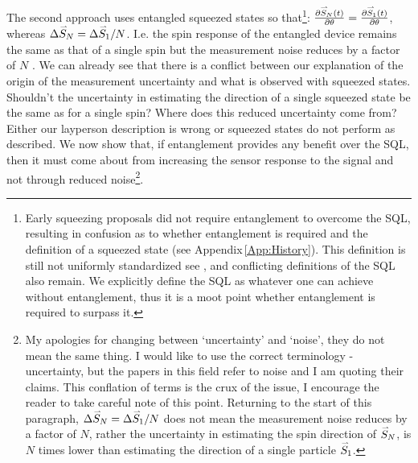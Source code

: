 \documentclass[reqno]{amsart}
\newcommand{\myvec}[1]{\accentset{\rightharpoonup}{#1}}
\begin{document}
The second approach uses entangled squeezed states so that\footnote{Early squeezing proposals did not require entanglement to overcome the SQL, resulting in confusion as to whether entanglement is required and the definition of a squeezed state (see Appendix\,\ref{App:History}). This definition is still not uniformly standardized see \cite{Soerensen2001,Meyer2001,Maccone2020}, and conflicting definitions of the SQL also remain. We explicitly define the SQL as whatever one can achieve without entanglement, thus it is a moot point whether entanglement is required to surpass it.}: $\frac{\partial \myvec{S}_N(t)}{\partial \theta} = \frac{\partial \myvec{S}_1(t)}{\partial \theta}$, whereas $\Delta \myvec{S}_N = \Delta \myvec{S}_1/N$. I.e. the spin response of the entangled device remains the same as that of a single spin but the measurement noise reduces by a factor of $N$ \cite{Caves1981, Ma2011, Pezze2018, Gross2012, Ludlow2015, Walls1983, Wodkiewicz1985, Wu1986, Slusher1987, Xiao1987, Polzik1992, Wineland1992, Kitagawa1993, Wineland1994, Sanders1995, Kuzmich1998, Soerensen1998, Brif1999, Kuzmich2000, Meyer2001, Esteve2008, Appel2009, Eberle2010, Gross2010, Koschorreck2010, Koschorreck2010a, Leroux2010, Leroux2010a, LouchetChauvet2010, SchleierSmith2010, Wasilewski2010, Luecke2011, Sewell2012, Aasi2013, Taylor2013, Bohnet2014, Muessel2014, Strobel2014, Kruse2016, Polzik2016, Cox2016, Davis2016, Bohnet2016, Hosten2016, Linnemann2016, Macri2016, Tse2019, Braverman2019, Schulte2020, Malia2020, Bao2020, PedrozoPenafiel2020, Casacio2021, Gilmore2021, Greve2022, Malia2022}. We can already see that there is a conflict between our explanation of the origin of the measurement uncertainty and what is observed with squeezed states. Shouldn't the uncertainty in estimating the direction of a single squeezed state be the same as for a single spin? Where does this reduced uncertainty come from? Either our layperson description is wrong or squeezed states do not perform as described. We now show that, if entanglement provides any benefit over the SQL, then it must come about from increasing the sensor response to the signal and not through reduced noise\footnote{My apologies for changing between `uncertainty' and `noise', they do not mean the same thing. I would like to use the correct terminology - uncertainty, but the papers in this field refer to noise and I am quoting their claims. This conflation of terms is the crux of the issue, I encourage the reader to take careful note of this point. Returning to the start of this paragraph, $\Delta \myvec{S}_N = \Delta \myvec{S}_1/N$ does not mean the measurement noise reduces by a factor of $N$, rather the uncertainty in estimating the spin direction of $\myvec{S}_N$, is $N$ times lower than estimating the direction of a single particle $\myvec{S}_1$.}.\\
\end{document}
